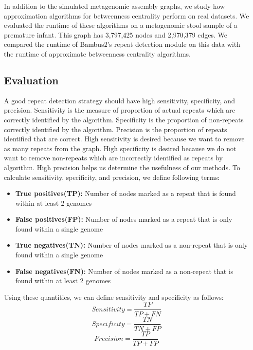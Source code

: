 \documentclass[runningheads,a4paper]{llncs}
\begin{document}
In addition to the simulated metagenomic assembly graphs, we study how approximation algorithms for betweenness centrality perform on real datasets. We evaluated the runtime  of these algorithms on a metagenomic stool sample of a premature infant\cite{morowitz2011strain}. This graph has 3,797,425 nodes and 2,970,379 edges. We compared the runtime of Bambus2's repeat detection module on this data with the runtime of approximate betweenness centrality algorithms.  

\subsection*{Evaluation}
A good repeat detection strategy should have high sensitivity, specificity, and precision. Sensitivity is the measure of proportion of actual repeats which are correctly identified by the algorithm. Specificity is the proportion of non-repeats correctly identified by the algorithm. Precision is the proportion of repeats identified that are correct. High sensitivity is desired because we want to remove as many repeats from the graph. High specificity is desired because we do not want to remove non-repeats which are incorrectly identified as repeats by algorithm. High precision helps us determine the usefulness of our methods. To calculate sensitivity, specificity, and precision, we define following terms:
\begin{itemize}
\item \textbf{True positives(TP):} Number of nodes marked as a repeat that is found within at least 2 genomes
\item \textbf{False positives(FP):} Number of nodes marked as a repeat that is only found within a single genome
\item \textbf{True negatives(TN):} Number of nodes marked as a non-repeat that is only found within a single genome
\item \textbf{False negatives(FN):} Number of nodes marked as a non-repeat that is found within at least 2 genomes
\end{itemize}

Using these quantities, we can define sensitivity and specificity as follows:
 $$Sensitivity = \frac{TP}{TP+FN}$$
 $$Specificity = \frac{TN}{TN+FP}$$
 $$Precision = \frac{TP}{TP + FP}$$
\end{document}
